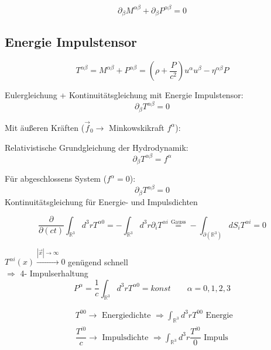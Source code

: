 \documentclass[a4paper, 11pt]{article}
\numberwithin{equation}{section}
\begin{document}
\begin{equation}
\partial_\beta M^{\alpha \beta} + \partial_\beta P^{\alpha \beta} = 0
\end{equation}


\subsection*{Energie Impulstensor}
\begin{equation}
T^{\alpha \beta} = M ^{\alpha \beta} + P ^{\alpha \beta} = \left( \rho + \dfrac{P}{c^2} \right) u^\alpha u^\beta - \eta^{\alpha \beta} P
\end{equation}

Eulergleichung + Kontinuitätsgleichung mit Energie Impulstensor:
\begin{equation}
\partial_\beta T^{\alpha \beta} = 0
\end{equation}

Mit äußeren Kräften ($\vec{f}_0 \rightarrow$ Minkowskikraft $f^\alpha$):

Relativistische Grundgleichung der Hydrodynamik:
\begin{equation}
\boxed{
\partial_\beta T^{\alpha \beta} = f^\alpha}
\end{equation}




Für abgeschlossens System ($f^\alpha = 0$):
\begin{equation}
\partial_\beta T^{\alpha \beta} = 0
\end{equation}
Kontinuitätsgleichung für Energie- und Impulsdichten

\begin{equation}
\dfrac{\partial}{\partial (c t)} \int_{\mathbb{R}^3} d^3 r T^{\alpha 0} = -  \int_{\mathbb{R}^3} d^3 r \partial_i T^{\alpha i} \overset{\text{Gauss}}{=} -  \int_{\partial (\mathbb{R}^3)} dS_i T^{\alpha i} = 0
\end{equation}

$T^{\alpha i}(x) \xrightarrow{| \vec{x} | \rightarrow \infty} 0$ genügend schnell\\
$\Rightarrow$ 4- Impulserhaltung
\begin{equation}
P^\alpha = \dfrac{1}{c}  \int_{\mathbb{R}^3} d^3r T^{\alpha 0} = konst \qquad \alpha = 0,1,2,3
\end{equation}



\begin{equation}
\begin{aligned}
&T^{00} \rightarrow \text{ Energiedichte } \Rightarrow  \int_{\mathbb{R}^3} d^3r T^{00} \text{ Energie } \\
&\dfrac{T^{i0}}{c} \rightarrow \text{ Impulsdichte } \Rightarrow  \int_{\mathbb{R}^3} d^3r \dfrac{T^{i0}}{0} \text{ Impuls }
\end{aligned}
\end{equation}
\end{document}
